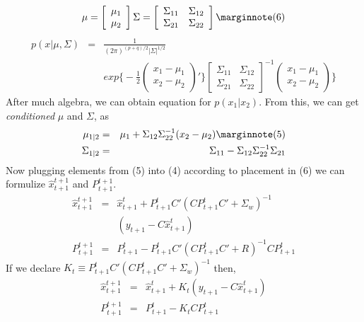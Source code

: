 \begin{eqnarray}
\mu = 
\left[ \begin{array}{c}
      \mu_1 \\
      \mu_2
      \end{array} \right]           
\Sigma = 
\left[ \begin{array}{cc}
      \Sigma_{11} & \Sigma_{12}\\
      \Sigma_{21} & \Sigma_{22}
      \end{array} \right] \mlabel{6}
\end{eqnarray}
\begin{eqnarray*}
p(x|\mu,\Sigma) &=& \frac{1}{(2\pi)^{(p+q)/2}|\Sigma|^{1/2}} \\
&& exp\bigg\{
-\frac{1}{2}
\left( \begin{array}{c}
      x_1 - \mu_1 \\
      x_2 - \mu_2
      \end{array} \right)'
\bigg\}
\left[ \begin{array}{cc}
      \Sigma_{11} & \Sigma_{12}\\
      \Sigma_{21} & \Sigma_{22}
      \end{array} \right]^{-1}
\left( \begin{array}{c}
      x_1 - \mu_1 \\
      x_2 - \mu_2
      \end{array} \right)
\bigg\} 
\end{eqnarray*}
After much algebra, we can obtain equation for $p(x_1|x_2)$. From this, we can
get {\em conditioned} $\mu$ and $\Sigma$, as
\begin{eqnarray}
\mu_{1|2} &=& \mu_1 + \Sigma_{12}\Sigma_{22}^{-1}(x_2 - \mu_2) \mlabel{5} \\
\Sigma_{1|2} &=& \Sigma_{11}-\Sigma_{12}\Sigma_{22}^{-1}\Sigma_{21} \nonumber
\end{eqnarray}
Now plugging elements from  (5) into (4) according
to placement in (6) we can formulize $\hat{x}_{t+1}^{t+1}$ and
$P_{t+1}^{t+1}$. 
\begin{eqnarray*}
\hat{x}_{t+1}^{t+1} &=& \hat{x}_{t+1}^t + P_{t+1}^tC'
                  (CP_{t+1}^tC'+ \Sigma_{w})^{-1} \\
               &&   (y_{t+1} - C\hat{x}_{t+1}^t) \\
P_{t+1}^{t+1} &=& P_{t+1}^t - P_{t+1}^tC' (CP_{t+1}^tC' + R)^{-1}CP_{t+1}^t
\end{eqnarray*}
If we declare $K_t \equiv P_{t+1}^tC' (CP_{t+1}^tC'+ \Sigma_{w})^{-1}$ then,
\begin{eqnarray}
\hat{x}_{t+1}^{t+1} &=& \hat{x}_{t+1}^t + K_t (y_{t+1} -
C\hat{x}_{t+1}^t) \label{xtplus1} \\
P_{t+1}^{t+1} &=& P_{t+1}^t - K_t C P_{t+1}^t
\end{eqnarray}

